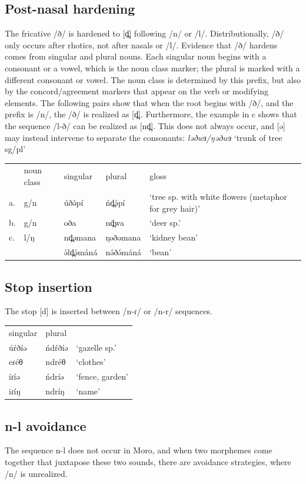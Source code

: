 \subsection{Post-nasal hardening}
The fricative /ð/ is hardened to [d̪] following /n/ or /l/. Distributionally, /ð/ only occurs after rhotics, not after nasals or /l/. Evidence that /ð/ hardens comes from singular and plural nouns. Each singular noun begins with a consonant or a vowel, which is the noun class marker; the plural is marked with a different consonant or vowel. The noun class is determined by this prefix, but also by the concord/agreement markers that appear on the verb or modifying elements. The following pairs show that when the root begins with /ð/, and the prefix is /n/, the /ð/ is realized as [d̪]. Furthermore, the example in c shows that the sequence /l-ð/ can be realized as [nd̪]. This does not always occur, and [ə] may instead intervene to separate the consonants: \textit{ləðwɜ/ŋəðwɜ} ‘trunk of tree sg/pl’

\ea
\begin{tabular}[t]{llllp{4cm}}
&	noun class	&	singular		&	plural	&	gloss\\
a.	&	g/n	&	úðə́pí		&	ńd̪ə́pí	&	‘tree sp. with white flowers (metaphor for grey hair)’\\
b.	&	g/n	&	oða	&	nd̪wa	&	‘deer sp.’\\
c.	&	l/ŋ	&	nd̪əmana	&	ŋəðəmana	&	‘kidney bean’\\
&&	ə́ld̪ə́máná	&	nə́ðə́máná	&	‘bean’\\
\end{tabular}
\z

\subsection{Stop insertion}
The stop [d] is inserted between /n-ɾ/ or /n-r/ sequences. 

\ea
\begin{tabular}[t]{lll}
singular	&	plural\\
úŕðíə	&	ńdŕðíə	&	 ‘gazelle sp.’\\
eɾéθ	&	ndréθ	&	‘clothes’\\
íɾíə	&	ńdríə	&	‘fence, garden’\\
iɾíŋ	&	ndríŋ	&	‘name’\\
\end{tabular}
\z


\subsection{n-l avoidance}
The sequence n-l does not occur in Moro, and when two morphemes come together that juxtapose these two sounds, there are avoidance strategies, where /n/ is unrealized. 

